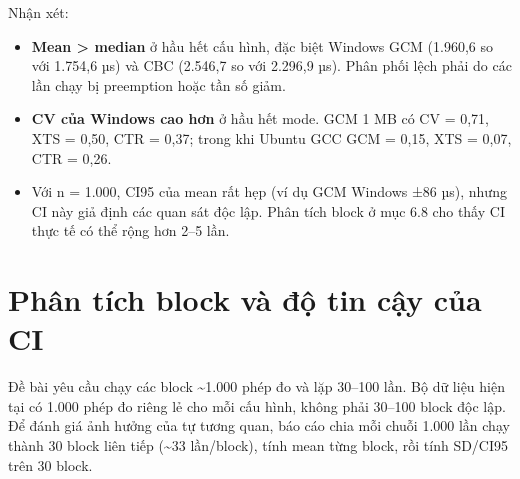 \documentclass[12pt,a4paper,oneside]{report}
\begin{document}
Nhận xét:


\begin{itemize}[leftmargin=*]
\item \textbf{Mean > median} ở hầu hết cấu hình, đặc biệt Windows GCM (1.960,6 so với 1.754,6 µs) và CBC (2.546,7 so với 2.296,9 µs). Phân phối lệch phải do các lần chạy bị preemption hoặc tần số giảm.
\item \textbf{CV của Windows cao hơn} ở hầu hết mode. GCM 1 MB có CV = 0,71, XTS = 0,50, CTR = 0,37; trong khi Ubuntu GCC GCM = 0,15, XTS = 0,07, CTR = 0,26.
\item Với n = 1.000, CI95 của mean rất hẹp (ví dụ GCM Windows ±86 µs), nhưng CI này giả định các quan sát độc lập. Phân tích block ở mục 6.8 cho thấy CI thực tế có thể rộng hơn 2–5 lần.
\end{itemize}


\section{Phân tích block và độ tin cậy của CI}


Đề bài yêu cầu chạy các block \textasciitilde{}1.000 phép đo và lặp 30–100 lần. Bộ dữ liệu hiện tại có 1.000 phép đo riêng lẻ cho mỗi cấu hình, không phải 30–100 block độc lập. Để đánh giá ảnh hưởng của tự tương quan, báo cáo chia mỗi chuỗi 1.000 lần chạy thành 30 block liên tiếp (\textasciitilde{}33 lần/block), tính mean từng block, rồi tính SD/CI95 trên 30 block.
\end{document}
